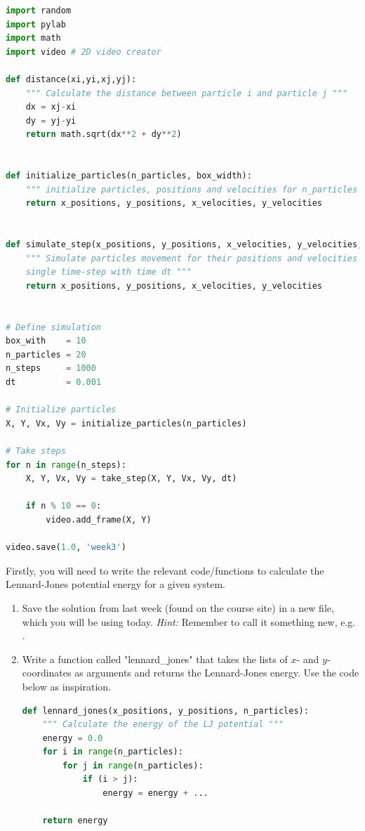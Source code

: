 \documentclass{article}
\begin{document}
\begin{lstlisting}[language=python]
import random
import pylab
import math
import video # 2D video creator

def distance(xi,yi,xj,yj):
    """ Calculate the distance between particle i and particle j """
    dx = xj-xi
    dy = yj-yi
    return math.sqrt(dx**2 + dy**2)


def initialize_particles(n_particles, box_width):
    """ initialize particles, positions and velocities for n_particles """
    return x_positions, y_positions, x_velocities, y_velocities


def simulate_step(x_positions, y_positions, x_velocities, y_velocities, dt):
    """ Simulate particles movement for their positions and velocities in a
    single time-step with time dt """
    return x_positions, y_positions, x_velocities, y_velocities


# Define simulation
box_with    = 10
n_particles = 20
n_steps     = 1000
dt          = 0.001

# Initialize particles
X, Y, Vx, Vy = initialize_particles(n_particles)

# Take steps
for n in range(n_steps):
    X, Y, Vx, Vy = take_step(X, Y, Vx, Vy, dt)

    if n % 10 == 0:
        video.add_frame(X, Y)

video.save(1.0, 'week3')

\end{lstlisting}

\newpage
\clearpage


Firstly, you will need to write the relevant code/functions to calculate the
Lennard-Jones potential energy for a given system.

\begin{enumerate}

    \item Save the solution from last week (found on the course site) in a new file, which you will be using today.
        {\em Hint:} Remember to call it something new, e.g. .


    \item Write a function called "lennard\_jones" that takes the lists of $x$- and $y$-coordinates as arguments and returns the Lennard-Jones energy. Use the code below as inspiration.
\begin{lstlisting}[language=python]
def lennard_jones(x_positions, y_positions, n_particles):
    """ Calculate the energy of the LJ potential """
    energy = 0.0
    for i in range(n_particles):
        for j in range(n_particles):
            if (i > j):
                energy = energy + ...

    return energy
\end{lstlisting}

\end{enumerate}
\end{document}
